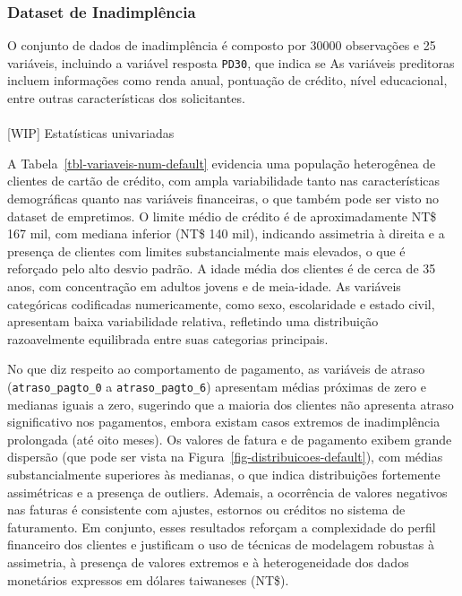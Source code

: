\documentclass[
  brazilian,
  12pt,
  letterpaper,
  DIV=11,
  numbers=noendperiod]{scrartcl}
\makeatletter
\let\oldparagraph\paragraph
\renewcommand{\paragraph}{
    \@ifstar
      \xxxParagraphStar
      \xxxParagraphNoStar
  }
\newcommand{\xxxParagraphStar}[1]{\oldparagraph*{#1}\mbox{}}
\newcommand{\xxxParagraphNoStar}[1]{\oldparagraph{#1}\mbox{}}
\makeatother
\begin{document}
\subsubsection{Dataset de
Inadimplência}\label{dataset-de-inadimpluxeancia}

O conjunto de dados de inadimplência é composto por 30000 observações e
25 variáveis, incluindo a variável resposta \texttt{PD30}, que indica se
As variáveis preditoras incluem informações como renda anual, pontuação
de crédito, nível educacional, entre outras características dos
solicitantes.

\paragraph{{[}WIP{]} Estatísticas
univariadas}\label{wip-estatuxedsticas-univariadas}

A Tabela~\ref{tbl-variaveis-num-default} evidencia uma população
heterogênea de clientes de cartão de crédito, com ampla variabilidade
tanto nas características demográficas quanto nas variáveis financeiras,
o que também pode ser visto no dataset de empretimos. O limite médio de
crédito é de aproximadamente NT\$ 167 mil, com mediana inferior (NT\$
140 mil), indicando assimetria à direita e a presença de clientes com
limites substancialmente mais elevados, o que é reforçado pelo alto
desvio padrão. A idade média dos clientes é de cerca de 35 anos, com
concentração em adultos jovens e de meia-idade. As variáveis categóricas
codificadas numericamente, como sexo, escolaridade e estado civil,
apresentam baixa variabilidade relativa, refletindo uma distribuição
razoavelmente equilibrada entre suas categorias principais.

No que diz respeito ao comportamento de pagamento, as variáveis de
atraso (\texttt{atraso\_pagto\_0} a \texttt{atraso\_pagto\_6})
apresentam médias próximas de zero e medianas iguais a zero, sugerindo
que a maioria dos clientes não apresenta atraso significativo nos
pagamentos, embora existam casos extremos de inadimplência prolongada
(até oito meses). Os valores de fatura e de pagamento exibem grande
dispersão (que pode ser vista na
Figura~\ref{fig-distribuicoes-default}), com médias substancialmente
superiores às medianas, o que indica distribuições fortemente
assimétricas e a presença de outliers. Ademais, a ocorrência de valores
negativos nas faturas é consistente com ajustes, estornos ou créditos no
sistema de faturamento. Em conjunto, esses resultados reforçam a
complexidade do perfil financeiro dos clientes e justificam o uso de
técnicas de modelagem robustas à assimetria, à presença de valores
extremos e à heterogeneidade dos dados monetários expressos em dólares
taiwaneses (NT\$).
\end{document}
